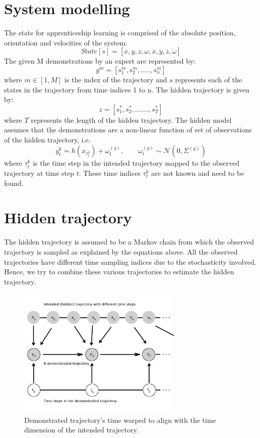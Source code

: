 \documentclass[hidelinks,BTech]{iitmdiss}
\begin{document}
\section{System modelling}
The state for apprenticeship learning is comprised of the absolute position, orientation and velocities of the system:
\begin{equation}
	State[s] = [x,y,z,\omega, \dot x, \dot y, \dot z, \dot \omega]
\end{equation}
The given M demonstrations by an expert are represented by: 
\begin{equation}
y^m = [s^m_1, s^m_2, ..... , s^m_n]	
\end{equation}
where $m \in [1, M]$ is the index of the trajectory and $s$ represents each of the states in the trajectory from time indices 1 to n. The hidden trajectory is given by:
\begin{equation}
	z = [s^*_1, s^*_2, ....... , s^*_T]
\end{equation}
where $T$ represents the length of the hidden trajectory. The hidden model assumes that the demonstrations are a non-linear function of set of observations of the hidden trajectory, i.e.
\begin{equation}
  y_{t}^{k} = h(x_{\tau_t^k}) + {\omega}_{t}^{(y)}, \qquad \omega_t^{(y)} \sim \mathcal{N} (0, \Sigma^{(y)})
\end{equation}
where $\tau_t^k$ is the time step in the intended trajectory mapped to the observed trajectory at time step $t$. These time indices $\tau_t^k$ are not known and need to be found.   

\section{Hidden trajectory}
The hidden trajectory is assumed to be a Markov chain from which the observed trajectory is sampled as explained by the equations above. All the observed trajectories have different time sampling indices due to the stochasticity involved. Hence, we try to combine these various trajectories to estimate the hidden trajectory.

\begin{figure}[H]
  \centering
    \includegraphics[width=0.7\textwidth]{timewarp.png}
    \caption{Demonstrated trajectory's time warped to align with the time dimension of the intended trajectory.}
\end{figure}
\end{document}
